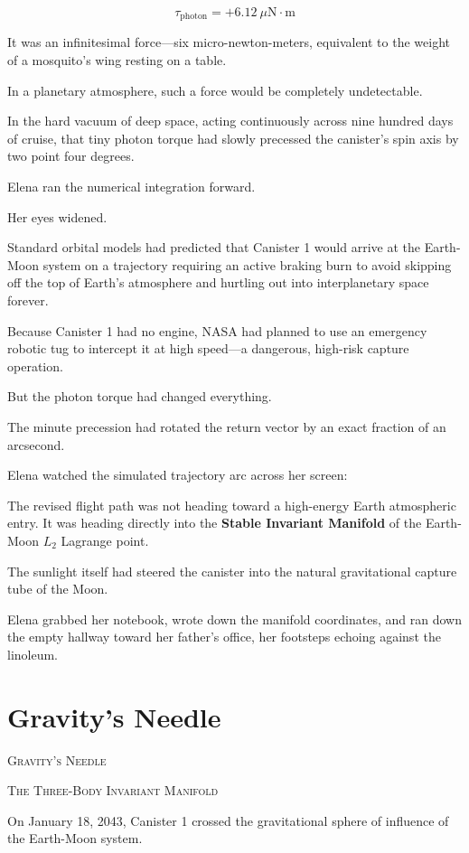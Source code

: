\documentclass[12pt,twoside,openright]{book}
\newcommand{\sceneheader}[1]{%
  \par\vspace{1.8em}%
  {\noindent\centering\scshape\large #1\par}%
  \vspace{1.0em}%
  \noindent%
}
\begin{document}
\[\tau_{\text{photon}} = +6.12 \ \mu\text{N}\cdot\text{m}\]

It was an infinitesimal force---six micro-newton-meters, equivalent to
the weight of a mosquito's wing resting on a table.

In a planetary atmosphere, such a force would be completely
undetectable.

In the hard vacuum of deep space, acting continuously across nine
hundred days of cruise, that tiny photon torque had slowly precessed the
canister's spin axis by two point four degrees.

Elena ran the numerical integration forward.

Her eyes widened.

Standard orbital models had predicted that Canister 1 would arrive at
the Earth-Moon system on a trajectory requiring an active braking burn
to avoid skipping off the top of Earth's atmosphere and hurtling out
into interplanetary space forever.

Because Canister 1 had no engine, NASA had planned to use an emergency
robotic tug to intercept it at high speed---a dangerous, high-risk
capture operation.

But the photon torque had changed everything.

The minute precession had rotated the return vector by an exact fraction
of an arcsecond.

Elena watched the simulated trajectory arc across her screen:

The revised flight path was not heading toward a high-energy Earth
atmospheric entry. It was heading directly into the \textbf{Stable
Invariant Manifold} of the Earth-Moon \(L_2\) Lagrange point.

The sunlight itself had steered the canister into the natural
gravitational capture tube of the Moon.

Elena grabbed her notebook, wrote down the manifold coordinates, and ran
down the empty hallway toward her father's office, her footsteps echoing
against the linoleum.

\chapter{Gravity's Needle}
\sceneheader{Gravity's Needle}

\sceneheader{The Three-Body Invariant
Manifold}

On January 18, 2043, Canister 1 crossed the gravitational sphere of
influence of the Earth-Moon system.
\end{document}

